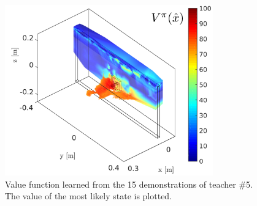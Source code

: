 \documentclass[final,3p,times,twocolumn]{elsarticle}
\begin{document}
\begin{figure}
 \centering
 \includegraphics[width=0.8\textwidth]{./Figures/Fig/value_subj_5.pdf}
 \caption{Value function learned from the 15 demonstrations of teacher \#5. The value of the most likely state is plotted.}
 \label{fig:value_function_subj_5}
\end{figure}
 
\end{document}
